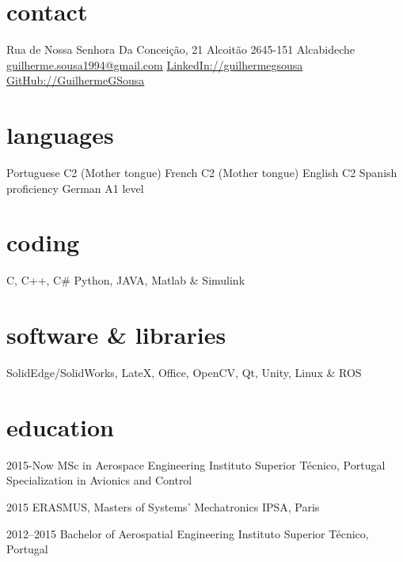 \documentclass[]{friggeri-cv} %
\begin{document}


\begin{aside} %
\section{contact}
Rua de Nossa Senhora Da Conceição, 21
Alcoitão
2645-151 Alcabideche\newline
\href{mailto:guilherme.sousa1994@gmail.com}{guilherme.sousa1994\newline @gmail.com}
\href{https://www.linkedin.com/in/guilhermegsousa}{LinkedIn://guilhermegsousa}
\href{https://github.com/GuilhermeGSousa}{GitHub://GuilhermeGSousa}
\section{languages}
Portuguese C2 (Mother tongue)
French C2 (Mother tongue)
English C2
Spanish proficiency
German A1 level
\section{coding}
C, C++, C\#
Python,
JAVA, Matlab \& Simulink
\section{software \& libraries}
SolidEdge/SolidWorks,
LateX, Office,
OpenCV, Qt, Unity,
Linux \& ROS
\end{aside}


\section{education}

\begin{entrylist}


\entry
{2015-Now}
{MSc {\normalfont in Aerospace Engineering}}
{Instituto Superior Técnico, Portugal}
{Specialization in Avionics and Control}%


\entry
{2015}
{ERASMUS, Masters {\normalfont of Systems' Mechatronics} }
{IPSA, Paris}
{\emph{} \\ }

\entry
{2012--2015}
{Bachelor {\normalfont of Aerospatial Engineering}}
{Instituto Superior Técnico, Portugal}
{}


\end{entrylist}
\end{document}
